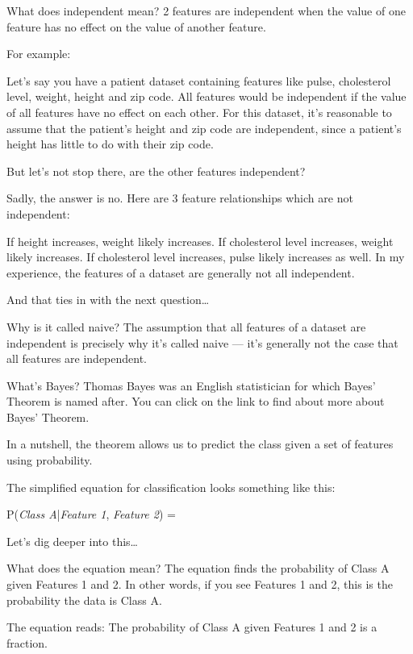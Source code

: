 What does independent mean? 2 features are independent when the value of one feature has no effect on the value of another feature.

For example:

Let’s say you have a patient dataset containing features like pulse, cholesterol level, weight, height and zip code. All features would be independent if the value of all features have no effect on each other. For this dataset, it’s reasonable to assume that the patient’s height and zip code are independent, since a patient’s height has little to do with their zip code.

But let’s not stop there, are the other features independent?

Sadly, the answer is no. Here are 3 feature relationships which are not independent:

If height increases, weight likely increases.
If cholesterol level increases, weight likely increases.
If cholesterol level increases, pulse likely increases as well.
In my experience, the features of a dataset are generally not all independent.

And that ties in with the next question…

Why is it called naive? The assumption that all features of a dataset are independent is precisely why it’s called naive — it’s generally not the case that all features are independent.

What’s Bayes? Thomas Bayes was an English statistician for which Bayes’ Theorem is named after. You can click on the link to find about more about Bayes’ Theorem.

In a nutshell, the theorem allows us to predict the class given a set of features using probability.

The simplified equation for classification looks something like this:

P(\textit{Class A}|\textit{Feature 1}, \textit{Feature 2}) = 

Let’s dig deeper into this…

What does the equation mean? The equation finds the probability of Class A given Features 1 and 2. In other words, if you see Features 1 and 2, this is the probability the data is Class A.

The equation reads: The probability of Class A given Features 1 and 2 is a fraction.

